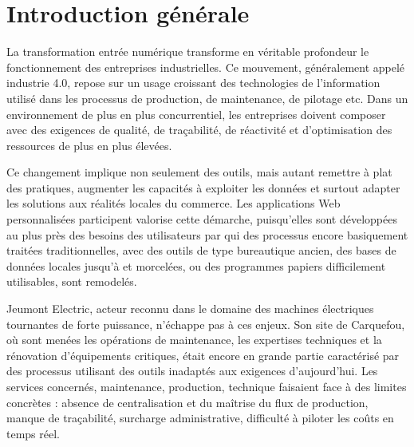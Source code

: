 \documentclass[11pt,a4paper]{article}
\begin{document}
\newpage
\begin{spacing}{1} %
	\renewcommand{\contentsname}{Table des matières}
	{\normalsize
	\tableofcontents}
\end{spacing}

\newpage

\renewcommand{\listfigurename}{Tables des images}
\listoffigures

\newpage
\listoftables

\newpage
\section*{Introduction générale}

La transformation entrée numérique transforme en véritable profondeur le fonctionnement des entreprises industrielles. Ce mouvement, généralement appelé industrie 4.0, repose sur un usage croissant des technologies de l’information utilisé dans les processus de production, de maintenance, de pilotage etc. Dans un environnement de plus en plus concurrentiel, les entreprises doivent composer avec des exigences de qualité, de traçabilité, de réactivité et d’optimisation des ressources de plus en plus élevées. 

Ce changement implique non seulement des outils, mais autant remettre à plat des pratiques, augmenter les capacités à exploiter les données et surtout adapter les solutions aux réalités locales du commerce. Les applications Web personnalisées participent valorise cette démarche, puisqu’elles sont développées au plus près des besoins des utilisateurs par qui des processus encore basiquement traitées traditionnelles, avec des outils de type bureautique ancien, des bases de données locales jusqu’à et morcelées, ou des programmes papiers difficilement utilisables, sont remodelés.

Jeumont Electric, acteur reconnu dans le domaine des machines électriques tournantes de forte puissance, n’échappe pas à ces enjeux.  Son site de Carquefou, où sont menées les opérations de maintenance, les expertises techniques et la rénovation d’équipements critiques, était encore en grande partie caractérisé par des processus utilisant des outils inadaptés aux exigences d'aujourd’hui. Les services concernés, maintenance, production, technique faisaient face à des limites concrètes : absence de centralisation et du maîtrise du flux de production, manque de traçabilité, surcharge administrative, difficulté à piloter les coûts en temps réel.
\end{document}
